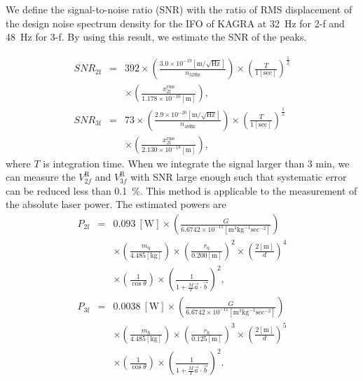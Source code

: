 \documentclass[%
 reprint,
superscriptaddress,
 amsmath,amssymb,
 aps,
]{revtex4-1}
\begin{document}
We define the signal-to-noise ratio (SNR) with the ratio of RMS displacement of the design noise spectrum density for the IFO of KAGRA at 32~Hz for 2-f and 48~Hz for 3-f.
By using this result, we estimate the SNR of the peaks.

\footnotesize
\begin{eqnarray}
\!S\!N\!R_{\mathrm{2f}}&=&392 \times \left(\frac{3.0 \times 10^{-19} [\mathrm{m/\sqrt{Hz}}]}{n_{\mathrm{32Hz}}} \right)  \times \left(\frac{T}{1 [\mathrm{sec}]} \right)^{\frac{1}{2}} \nonumber \\
 &&\times \left(\frac{x_{\mathrm{2f}}^{\mathrm{rms}}}{1.178 \times 10^{-16}\mathrm{[m]} }  \right),   \\
\!S\!N\!R_{\mathrm{3f}}&=&73 \times \left(\frac{2.9 \times 10^{-20} [\mathrm{m/\sqrt{Hz}}]}{n_{\mathrm{48Hz}}} \right) \times \left(\frac{T}{1 [\mathrm{sec}]} \right)^{\frac{1}{2}}  \nonumber \\ 
&&\times \left(\frac{x_{\mathrm{2f}}^{\mathrm{rms}}}{2.130 \times 10^{-18}\mathrm{[m] }} \right),
\end{eqnarray}
\normalsize
where $T$ is integration time. When we integrate the signal larger than 3 min, we can measure the $V^{\mathrm{R}}_{2f}$ and $V^{\mathrm{R}}_{3f}$ with SNR large enough such that systematic error can be reduced less than 0.1~\%. 
This method is applicable to the measurement of the absolute laser power. The estimated powers are
\footnotesize
\begin{eqnarray}
P_{\mathrm{2f}}&=&0.093 ~\mathrm{[W]}\times \left( \frac{G}{6.6742 \times 10^{-11} \mathrm{[m^3kg^{-1}sec^{-2}]}} \right) \nonumber \\
&& \times \left( \frac{m_{\mathrm{q}}}{4.485 \mathrm{[kg]}} \right) \times \left( \frac{r_{\mathrm{q}}}{0.200 \mathrm{[m]}} \right)^2 \times \left( \frac{2\mathrm{[m]}}{d} \right)^4 \nonumber \\ &&\times \left( \frac{1}{\cos{\theta}} \right) \times \left( \frac{1}{1+\frac{M}{I}\vec{a}\cdot \vec{b}} \right)^2,\\
P_{\mathrm{3f}}&=&0.0038~\mathrm{[W]} \times \left( \frac{G}{6.6742 \times 10^{-11} \mathrm{[m^3kg^{-1}sec^{-2}]}} \right) \nonumber \\
&& \times \left( \frac{m_{\mathrm{h}}}{4.485 \mathrm{[kg]}} \right) \times \left( \frac{r_{\mathrm{h}}}{0.125 \mathrm{[m]}} \right)^3 \times \left( \frac{2\mathrm{[m]}}{d} \right)^5 \nonumber \\ &&\times \left( \frac{1}{\cos{\theta}} \right) \times \left( \frac{1}{1+\frac{M}{I}\vec{a}\cdot \vec{b}} \right)^2.
\end{eqnarray}
\end{document}
